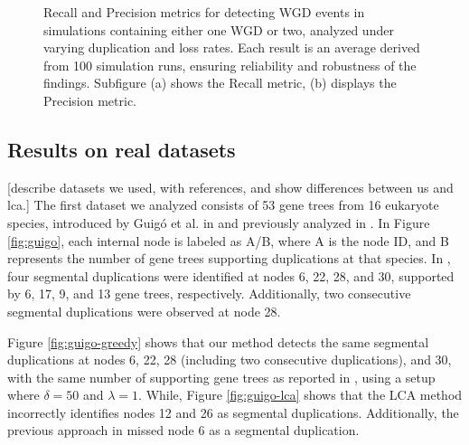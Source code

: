 \documentclass[10pt]{article}
\newcommand{\ml}[1]{\begingroup\color{blue}#1\endgroup}
\begin{document}
\begin{figure}[h!]
    \caption{
Recall and Precision metrics for detecting WGD events in simulations containing either one WGD or two, analyzed under varying duplication and loss rates. Each result is an average derived from 100 simulation runs, ensuring reliability and robustness of the findings. Subfigure (a) shows the Recall metric, (b) displays the Precision metric.
    }
    \label{fig:recall-precision-wgd}
\end{figure}


\subsection{Results on real datasets}

\ml{[describe datasets we used, with references, and show differences between us and lca.]}
The first dataset we analyzed consists of 53 gene trees from 16 eukaryote species, introduced by Guigó et al. in \cite{guigo1996reconstruction} and previously analyzed in \cite{bansal2008multiple, page2001vertebrate, dondi2019reconciling}. In Figure \ref{fig:guigo}, each internal node is labeled as A/B, where A is the node ID, and B represents the number of gene trees supporting duplications at that species. In \cite{guigo1996reconstruction}, four segmental duplications were identified at nodes 6, 22, 28, and 30, supported by 6, 17, 9, and 13 gene trees, respectively. Additionally, two consecutive segmental duplications were observed at node 28.

Figure \ref{fig:guigo-greedy} shows that our method detects the same segmental duplications at nodes 6, 22, 28 (including two consecutive duplications), and 30, with the same number of supporting gene trees as reported in \cite{guigo1996reconstruction}, using a setup where $\delta = 50$ and $\lambda = 1$. While, Figure \ref{fig:guigo-lca} shows that the LCA method incorrectly identifies nodes 12 and 26 as segmental duplications. Additionally, the previous approach in \cite{dondi2019reconciling} missed node 6 as a segmental duplication.
\end{document}
